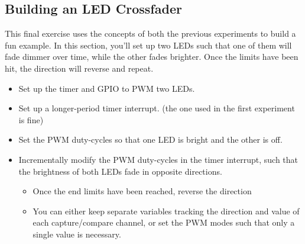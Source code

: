 \documentclass[11pt,fleqn]{book} %
\begin{document}
\subsection{Building an LED Crossfader}
This final exercise uses the concepts of both the previous experiments to build a fun example. In this section, you'll set up two LEDs such that one of them will fade dimmer over time, while the other fades brighter. Once the limits have been hit, the direction will reverse and repeat. 

\begin{itemize}
    \item Set up the timer and GPIO to PWM two LEDs.
    \item Set up a longer-period timer interrupt. (the one used in the first experiment is fine)
    \item Set the PWM duty-cycles so that one LED is bright and the other is off.
    \item Incrementally modify the PWM duty-cycles in the timer interrupt, such that the brightness of both LEDs fade in opposite directions. 
    \begin{itemize}
        \item Once the end limits have been reached, reverse the direction
        \item You can either keep separate variables tracking the direction and value of each capture/compare channel, or set the PWM modes such that only a single value is necessary.
    \end{itemize}
\end{itemize}
 
\end{document}
